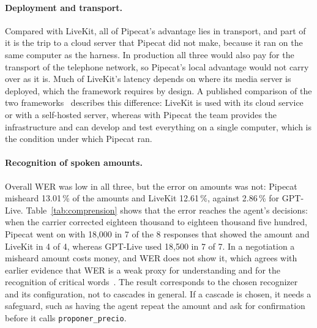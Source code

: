 \documentclass[11pt]{article}
\newcommand{\RCompCorregidoC}{7}
\newcommand{\RCompRetractadoA}{7}
\newcommand{\RCompRetractadoB}{4}
\newcommand{\RCompVisibleA}{8}
\newcommand{\RCompVisibleB}{4}
\newcommand{\RCompVisibleC}{7}
\newcommand{\RMontosA}{13.01}
\newcommand{\RMontosB}{12.61}
\newcommand{\RMontosC}{2.86}
\begin{document}
\paragraph{Deployment and transport.} Compared with LiveKit, all of Pipecat's advantage
lies in transport, and part of it is the trip to a cloud server that Pipecat did not
make, because it ran on the same computer as the harness. In production all three
would also pay for the transport of the telephone network, so Pipecat's local
advantage would not carry over as it is. Much of LiveKit's latency depends on where
its media server is deployed, which the framework requires by design. A published
comparison of the two frameworks~\cite{chanl} describes this difference: LiveKit is
used with its cloud service or with a self-hosted server, whereas with Pipecat the
team provides the infrastructure and can develop and test everything on a single
computer, which is the condition under which Pipecat ran.

\paragraph{Recognition of spoken amounts.} Overall WER was low in
all three, but the error on amounts was not: Pipecat misheard \RMontosA\,\% of the
amounts and LiveKit \RMontosB\,\%, against \RMontosC\,\% for GPT-Live.
Table~\ref{tab:comprension} shows that the error reaches the agent's decisions: when the carrier corrected eighteen thousand to eighteen thousand five hundred, Pipecat went on with 18,000 in \RCompRetractadoA{} of the \RCompVisibleA{} responses that showed the amount and LiveKit in \RCompRetractadoB{} of \RCompVisibleB, whereas GPT-Live used 18,500 in \RCompCorregidoC{} of \RCompVisibleC.
In a negotiation a misheard amount costs money, and WER does not
show it, which agrees with earlier evidence that WER is a weak proxy for understanding and for the recognition of critical words~\cite{wang2003wer,benjannet2015}. The result corresponds to the chosen recognizer and its configuration, not to
cascades in general. If a cascade is chosen, it needs a safeguard, such as having the
agent repeat the amount and ask for confirmation before it calls
\texttt{proponer\_precio}.
\end{document}
